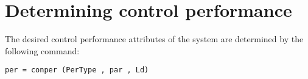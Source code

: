 \documentclass [12pt , a4paper] {report}
\begin{document}
\section{Determining control performance}
The desired control performance attributes of the system are determined by the following command:
\begin{lstlisting}
per = conper (PerType , par , Ld) 
\end{lstlisting}
\end{document}

